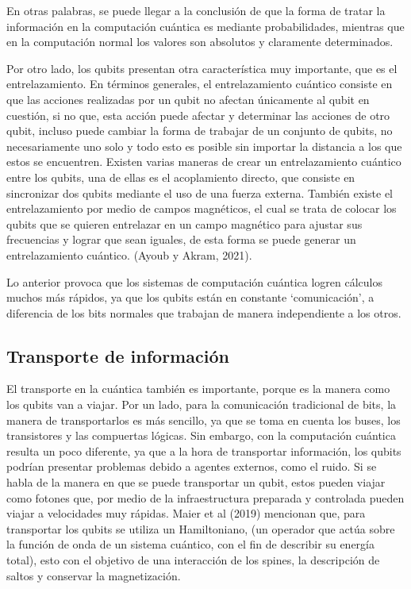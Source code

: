 \documentclass{article}
\begin{document}
En otras palabras, se puede llegar a la conclusión de que la forma de tratar la información en la computación cuántica es mediante probabilidades, mientras que en la computación normal los valores son absolutos y claramente determinados.

Por otro lado, los qubits presentan otra característica muy importante, que es el entrelazamiento. En términos generales, el entrelazamiento cuántico consiste en que las acciones realizadas por un qubit no afectan únicamente al qubit en cuestión, si no que, esta acción puede afectar y determinar las acciones de otro qubit, incluso puede cambiar la forma de trabajar de un conjunto de qubits, no necesariamente uno solo y todo esto es posible sin importar la distancia a los que estos se encuentren. 
Existen varias maneras de crear un entrelazamiento cuántico entre los qubits, una de ellas es el acoplamiento directo, que consiste en sincronizar dos qubits mediante el uso de una fuerza externa. También existe el entrelazamiento por medio de campos magnéticos, el cual se trata de colocar los qubits que se quieren entrelazar en un campo magnético para ajustar sus frecuencias y lograr que sean iguales, de esta forma se puede generar un entrelazamiento cuántico. (Ayoub y Akram, 2021).

Lo anterior provoca que los sistemas de computación cuántica logren cálculos muchos más rápidos, ya que los qubits están en constante ‘comunicación’, a diferencia de los bits normales que trabajan de manera independiente a los otros. 

\subsection{Transporte de información}
El transporte en la cuántica también es importante, porque es la manera como los qubits van a viajar. Por un lado, para la comunicación tradicional de bits, la manera de transportarlos es más sencillo, ya que se toma en cuenta los buses, los transistores y las compuertas lógicas. Sin embargo, con la computación cuántica resulta un poco diferente, ya que a la hora de transportar información, los qubits podrían presentar problemas debido a agentes externos, como el ruido.
Si se habla de la manera en que se puede transportar un qubit, estos pueden viajar como fotones que, por medio de la infraestructura preparada y controlada pueden viajar a velocidades muy rápidas. Maier et al (2019) mencionan que, para transportar los qubits se utiliza un Hamiltoniano, (un operador que actúa sobre la función de onda de un sistema cuántico, con el fin de describir su energía total), esto con el objetivo de una interacción de los spines, la descripción de saltos y conservar la magnetización.
\end{document}
